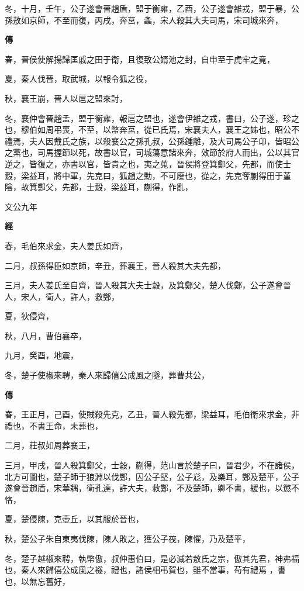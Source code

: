 \documentclass{ctexart}
\begin{document}
冬，十月，壬午，公子遂會晉趙盾，盟于衡雍，乙酉，公子遂會雒戎，盟于暴，公孫敖如京師，不至而復，丙戌，奔莒，螽，宋人殺其大夫司馬，宋司城來奔，

\textbf{傳}



春，晉侯使解揚歸匡戚之田于衛，且復致公婿池之封，自申至于虎牢之竟，

夏，秦人伐晉，取武城，以報令狐之役，

秋，襄王崩，晉人以扈之盟來討，

冬，襄仲會晉趙孟，盟于衡雍，報扈之盟也，遂會伊雒之戎，書曰，公子遂，珍之也，穆伯如周弔喪，不至，以幣奔莒，從已氏焉，宋襄夫人，襄王之姊也，昭公不禮焉，夫人因戴氏之族，以殺襄公之孫孔叔，公孫鍾離，及大司馬公子卬，皆昭公之黨也，司馬握節以死，故書以官，司城蕩意諸來奔，效節於府人而出，公以其官逆之，皆復之，亦書以官，皆貴之也，夷之蒐，晉侯將登箕鄭父，先都，而使士縠，梁益耳，將中軍，先克曰，狐趙之勳，不可廢也，從之，先克奪蒯得田于堇陰，故箕鄭父，先都，士縠，梁益耳，蒯得，作亂，





文公九年


\textbf{經}



春，毛伯來求金，夫人姜氏如齊，

二月，叔孫得臣如京師，辛丑，葬襄王，晉人殺其大夫先都，

三月，夫人姜氏至自齊，晉人殺其大夫士縠，及箕鄭父，楚人伐鄭，公子遂會晉人，宋人，衛人，許人，救鄭，

夏，狄侵齊，

秋，八月，曹伯襄卒，

九月，癸酉，地震，

冬，楚子使椒來聘，秦人來歸僖公成風之隧，葬曹共公，

\textbf{傳}



春，王正月，己酉，使賊殺先克，乙丑，晉人殺先都，梁益耳，毛伯衛來求金，非禮也，不書王命，未葬也，

二月，莊叔如周葬襄王，

三月，甲戌，晉人殺箕鄭父，士縠，蒯得，范山言於楚子曰，晉君少，不在諸侯，北方可圖也，楚子師于狼淵以伐鄭，囚公子堅，公子尨，及樂耳，鄭及楚平，公子遂會晉趙盾，宋華耦，衛孔達，許大夫，救鄭，不及楚師，卿不書，緩也，以懲不恪，

夏，楚侵陳，克壺丘，以其服於晉也，

秋，楚公子朱自東夷伐陳，陳人敗之，獲公子茷，陳懼，乃及楚平，

冬，楚子越椒來聘，執幣傲，叔仲惠伯曰，是必滅若敖氏之宗，傲其先君，神弗福也，秦人來歸僖公成風之襚，禮也，諸侯相弔賀也，雖不當事，苟有禮焉 ，書也，以無忘舊好，
\end{document}

